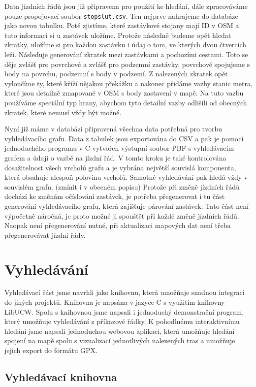 Data jízdních řádů jsou již připravena pro použití ke hledání, dále zpracováváme
pouze propojovací soubor {\tt stopslut.csv}. Ten nejprve nahrajeme do databáze
jako novou tabulku. Poté zjistíme, které zastávkové stojany mají ID v OSM a tuto
informaci si u zastávek uložíme. Protože následně budeme opět hledat zkratky,
uložíme si pro každou zastávku i údaj o tom, ve kterých dvou čtvercích leží.  
Následuje generování zkratek mezi zastávkami a pochozími cestami. Toto se děje
zvlášť pro povrchové a zvlášť pro podzemní zastávky, povrchové spojujeme s body
na povrchu, podzemní s body v podzemí. Z nalezených zkratek opět vyloučíme ty,
které kříží nějakou překážku a nakonec přidáme vazby stanic metra, které jsou
detailně zmapované v OSM s body zastavení v mapě. Na tuto vazbu používáme
speciální typ hrany, abychom tyto detailní vazby odlišili od obecných zkratek,
které nemusí vždy být možné. 

Nyní již máme v databázi připravená všechna data potřebná pro tvorbu
vyhledávacího grafu. Data z tabulek jsou exportována do CSV a pak je pomocí
jednoduchého programu v C vytvořen výstupní soubor PBF s vyhledávacím grafem a
údaji o vazbě na jízdní řád. V tomto kroku je také kontrolována dosažitelnost
všech vrcholů grafu a je vybrána největší souvislá komponenta, která obsahuje
alespoň polovinu vrcholů. Samotné vyhledávání pak hledá vždy v souvislém grafu.
(\TODO zmínit i v obecném popisu) Protože při změně jízdních řádů dochází ke změnám
očíslování zastávek, je potřeba přegenerovat i tu část generování vyhledávacího
grafu, která zajišťuje párování zastávek. Tato část není výpočetně náročná, je
proto možné ji spouštět při každé změně jízdních řádů. Naopak není přegenerování
nutné, při aktualizaci mapových dat není třeba přegenerovávat jízdní řády. 

\section{Vyhledávání}
Vyhledávací část jsme navrhli jako knihovnu, která umožňuje snadnou integraci do
jiných projektů. Knihovna je napsána v jazyce C s využitím knihovny LibUCW.
Spolu s knihovnou jsme napsali i jednoduchý demonstrační program, který umožňuje
vyhledávání z příkazové řádky. K pohodlnému interaktivnímu hledání jsme napsali
jednoduchou webovou aplikaci, která umožňuje hledání spojení na mapě spolu s
vizualizací jednotlivých nalezených tras a umožňuje jejich export do formátu
GPX.

\subsection{Vyhledávací knihovna}

